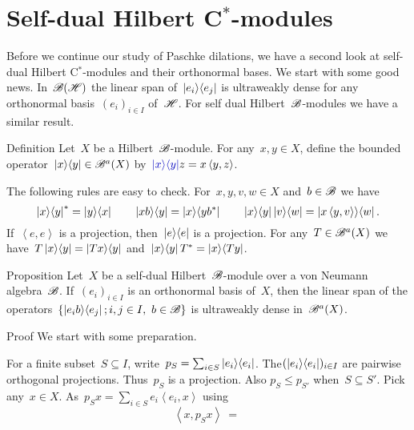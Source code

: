\documentclass[b]{subfiles}
\begin{document}
\section{Self-dual Hilbert C$^*$-modules}
\begin{parsec}%
\begin{point}%
Before we continue our study of Paschke dilations,
    we have a second look at
    self-dual Hilbert C$^*$-modules and their orthonormal bases.
We start with some good news.
In~$\mathscr{B}(\mathscr{H})$ the linear span of~$\left|e_i\right>\!\left<e_j\right|$
    is ultraweakly dense for any orthonormal basis~$(e_i)_{i \in I}$
    of~$\mathscr{H}$.
For self dual Hilbert~$\mathscr{B}$-modules
    we have a similar result.
\end{point}
\begin{point}{Definition}%
Let~$X$ be a Hilbert~$\mathscr{B}$-module.
For any~$x, y \in X$,
define the bounded operator~$\left|x\right>\!\left<y\right| \in \mathscr{B}^a(X)$
by~$\Define{\ketbra{x}{y}} z = x \left<y,z\right>$.
\begin{point}%
The following rules are easy to check.
For~$x,y,v,w \in X$ and~$b \in \mathscr{B}$
    we have
\begin{equation*}
\left|x\right>\!\left<y\right|^* = \left|y\right>\!\left<x\right| \qquad
\left|xb\right>\!\left<y\right| = \left|x\right>\!\left<yb^*\right| \qquad
\left|x\right>\!\left<y\right| \left|v\right>\!\left<w\right| = \left|x\left<y,v\right>\right>\!\left<w\right|.
\end{equation*}
If~$\left<e,e\right>$ is a projection,
    then~$\left|e\right>\!\left<e\right|$ is a projection.
For any~$T \in \mathscr{B}^a(X)$
    we have~$T \left|x\right>\!\left<y\right| = \left|Tx\right>\!\left<y\right|$
    and~$\left|x\right>\!\left<y\right|T^* = \left|x\right>\!\left<Ty\right|$.
\end{point}
\end{point}
\begin{point}{Proposition}%
Let~$X$ be a self-dual Hilbert~$\mathscr{B}$-module over a von Neumann algebra~$\mathscr{B}$.
If~$(e_i)_{i \in I}$ is an orthonormal basis of~$X$,
then the linear span of
    the operators~$\{ \left|e_i b\right>\!\left<e_j\right|; i,j \in I, \ b \in \mathscr{B}\}$
    is ultraweakly dense in~$\mathscr{B}^a(X)$.
\begin{point}{Proof}%
We start with some preparation.
\begin{point}%
For a finite subset~$S \subseteq I$,
    write~$p_S = \sum_{i \in S} \left|e_i\right>\!\left<e_i\right|$.
The$(\left|e_i\right>\!\left<e_i\right|)_{i \in I}$ are pairwise orthogonal projections.
Thus~$p_S$ is a projection.
Also $p_S \leq p_{S'}$ when~$S \subseteq S'$.
Pick any~$x \in X$.
As~$p_S x = \sum_{i \in S} e_i \left<e_i, x\right>$
using
\begin{equation*}
\left<x, p_S x\right> \ =\ 

\end{equation*}
\end{point}
\end{point}
\end{point}
\end{parsec}
\end{document}
